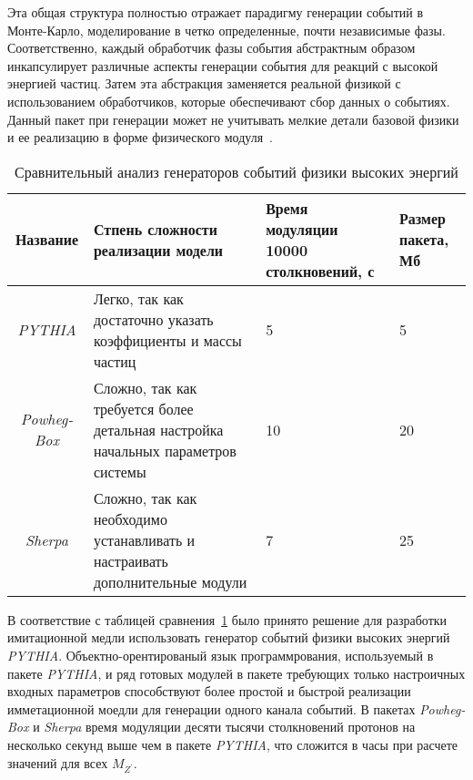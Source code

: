 Эта общая структура полностью отражает парадигму генерации событий в Монте-Карло,
моделирование в четко определенные, почти независимые фазы. Соответственно, каждый обработчик фазы события абстрактным образом инкапсулирует различные аспекты генерации события для реакций с высокой энергией частиц.
Затем эта абстракция заменяется реальной физикой с использованием обработчиков, которые обеспечивают сбор данных о событиях. Данный пакет при генерации может не учитывать мелкие детали базовой физики и ее реализацию в форме физического модуля~\cite{review-sherpa}.

\begin{table}[h!]
	\begin{flushleft}
		\caption{Сравнительный анализ генераторов событий физики
			высоких энергий}
		\label{tab:table1}
		\begin{tabular}{ | c | p{5cm} | p{4cm} | p{4cm} |}
			\hline
			Название & Стпень сложности реализации модели & Время модуляции 10000 столкновений, с & Размер пакета, Мб \\ \hline
			\textit{PYTHIA} & Легко, так как достаточно указать коэффициенты и массы частиц & \hspace{2cm}5 & \hspace{2cm}5 \\ \hline
			\textit{Powheg-Box} & Сложно, так как требуется более детальная настройка начальных параметров системы & \hspace{2cm}10 & \hspace{2cm}20 \\ \hline
			\textit{Sherpa} & Сложно, так как необходимо устанавливать и настраивать дополнительные модули & \hspace{2cm}7 & \hspace{2cm}25 \\
			\hline
		\end{tabular}
	\end{flushleft}
\end{table}

В соответствие с таблицей сравнения~\ref{tab:table1} было принято решение для разработки имитационной медли использовать генератор событий физики
высоких энергий \textit{PYTHIA}. Объектно-орентированый язык программрования, используемый в пакете \textit{PYTHIA}, и ряд готовых модулей в пакете требующих только настроичных входных параметров способствуют более простой и быстрой реализации имметационной моедли для генерации одного канала событий. В пакетах \textit{Powheg-Box} и \textit{Sherpa} время модуляции десяти тысячи столкновений протонов на несколько секунд выше чем в пакете \textit{PYTHIA}, что сложится в часы при расчете значений для всех ${M}_{{Z}^{\prime}}$.


